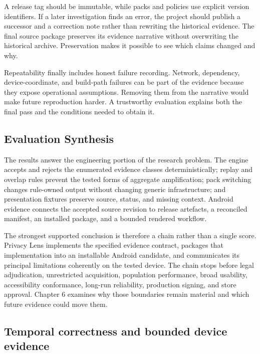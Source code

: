 A release tag should be immutable, while packs and policies use explicit version identifiers. If a later investigation finds an error, the project should publish a successor and a correction note rather than rewriting the historical evidence. The final source package preserves its evidence narrative without overwriting the historical archive. Preservation makes it possible to see which claims changed and why.

Repeatability finally includes honest failure recording. Network, dependency, device-coordinate, and build-path failures can be part of the evidence because they expose operational assumptions. Removing them from the narrative would make future reproduction harder. A trustworthy evaluation explains both the final pass and the conditions needed to obtain it.

\subsection{Evaluation Synthesis}

The results answer the engineering portion of the research problem. The engine accepts and rejects the enumerated evidence classes deterministically; replay and overlap rules prevent the tested forms of aggregate amplification; pack switching changes rule-owned output without changing generic infrastructure; and presentation fixtures preserve source, status, and missing context. Android evidence connects the accepted source revision to release artefacts, a reconciled manifest, an installed package, and a bounded rendered workflow.

The strongest supported conclusion is therefore a chain rather than a single score. Privacy Lens implements the specified evidence contract, packages that implementation into an installable Android candidate, and communicates its principal limitations coherently on the tested device. The chain stops before legal adjudication, unrestricted acquisition, population performance, broad usability, accessibility conformance, long-run reliability, production signing, and store approval. Chapter 6 examines why those boundaries remain material and which future evidence could move them.

\subsection{Temporal correctness and bounded device evidence}

